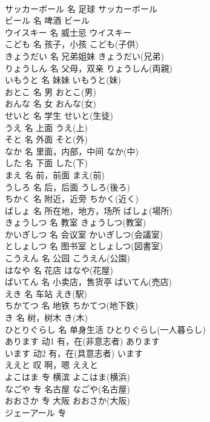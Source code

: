 \documentclass[8pt]{extreport}
\begin{document}
\begin{CJK}{UTF8}{min}
\\	サッカーボール	名	足球	サッカーボール	
\\	ビール	名	啤酒	ビール	
\\	ウイスキー	名	威士忌	ウイスキー	
\\	こども	名	孩子，小孩	こども(子供)	
\\	きょうだい	名	兄弟姐妹	きょうだい(兄弟)	
\\	りょうしん	名	父母，双亲	りょうしん(両親)	
\\	いもうと	名	妹妹	いもうと(妹)	
\\	おとこ	名	男	おとこ(男)	
\\	おんな	名	女	おんな(女)	
\\	せいと	名	学生	せいと(生徒)	
\\	うえ	名	上面	うえ(上)	
\\	そと	名	外面	そと(外)	
\\	なか	名	里面，内部，中间	なか(中)	
\\	した	名	下面	した(下)	
\\	まえ	名	前，前面	まえ(前)	
\\	うしろ	名	后，后面	うしろ(後ろ)	
\\	ちかく	名	附近，近旁	ちかく(近く)	
\\	ばしょ	名	所在地，地方，场所	ばしょ(場所)	
\\	きょうしつ	名	教室	きょうしつ(教室)	
\\	かいぎしつ	名	会议室	かいぎしつ(会議室)	
\\	としょしつ	名	图书室	としょしつ(図書室)	
\\	こうえん	名	公园	こうえん(公園)	
\\	はなや	名	花店	はなや(花屋)	
\\	ばいてん	名	小卖店，售货亭	ばいてん(売店)	
\\	えき	名	车站	えき(駅)	
\\	ちかてつ	名	地铁	ちかてつ(地下鉄)	
\\	き	名	树，树木	き(木)	
\\	ひとりぐらし	名	单身生活	ひとりぐらし(一人暮らし)	
\\	あります	动1	有，在(非意志者)	あります	
\\	います	动2	有，在(具意志者)	います	
\\	ええと	叹	啊，嗯	ええと	
\\	よこはま	专	横滨	よこはま(横浜)	
\\	なごや	专	名古屋	なごや(名古屋)	
\\	おおさか	专	大阪	おおさか(大阪)	
\\	ジェーアール	专	

\end{CJK}
\end{document}

